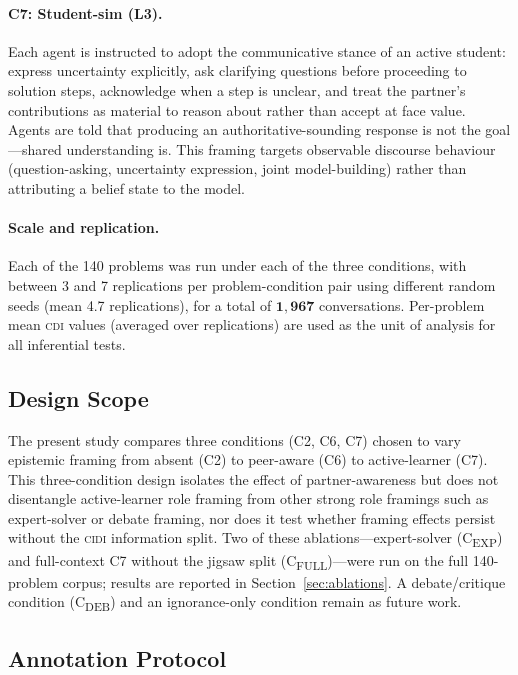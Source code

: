\documentclass{article}
\newcommand{\CDI}{\textsc{cdi}}
\newcommand{\CIDI}{\textsc{cidi}}
\begin{document}
\paragraph{C7: Student-sim (L3).}
Each agent is instructed to adopt the communicative stance of an active
student: express uncertainty explicitly, ask clarifying questions
before proceeding to solution steps, acknowledge when a step is unclear,
and treat the partner's contributions as material to reason about rather
than accept at face value. Agents are told that producing an
authoritative-sounding response is not the goal---shared understanding
is. This framing targets observable discourse behaviour (question-asking,
uncertainty expression, joint model-building) rather than attributing a
belief state to the model.

\paragraph{Scale and replication.}
Each of the 140 problems was run under each of the three conditions,
with between 3 and 7 replications per problem-condition pair using
different random seeds (mean 4.7 replications), for a total of
$\mathbf{1{,}967}$ conversations. Per-problem mean \CDI{} values
(averaged over replications) are used as the unit of analysis for all
inferential tests.

\subsection{Design Scope}
\label{sec:scope}

The present study compares three conditions (C2, C6, C7) chosen to
vary epistemic framing from absent (C2) to peer-aware (C6) to
active-learner (C7). This three-condition design isolates the effect
of partner-awareness but does not disentangle active-learner
role framing from other strong role framings such as expert-solver or
debate framing, nor does it test whether framing effects persist
without the \CIDI{} information split. Two of these ablations---expert-solver
(C\textsubscript{EXP}) and full-context C7 without the jigsaw split
(C\textsubscript{FULL})---were run on the full 140-problem corpus;
results are reported in Section~\ref{sec:ablations}. A debate/critique
condition (C\textsubscript{DEB}) and an ignorance-only condition remain
as future work.

\subsection{Annotation Protocol}
\label{sec:annotation}
\end{document}
